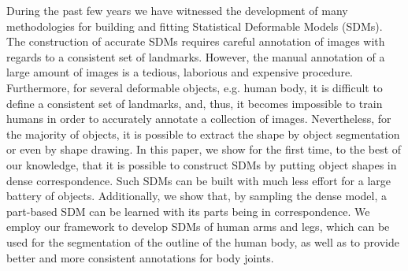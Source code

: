 
During the past few years we have witnessed the development of many methodologies for building and fitting Statistical Deformable Models (SDMs). The construction of accurate SDMs requires careful annotation of images with regards to a consistent set of landmarks. However, the manual annotation of a large amount of images is a tedious, laborious and expensive procedure. Furthermore, for several deformable objects, e.g. human body, it is difficult to define a consistent set of landmarks, and, thus, it becomes impossible to train humans in order to accurately annotate a collection of images. Nevertheless, for the majority of objects, it is possible to extract the shape by object segmentation or even by shape drawing. In this paper, we show for the first time, to the best of our knowledge, that it is possible to construct SDMs by putting object shapes in dense correspondence. Such SDMs can be built with much less effort for a large battery of objects. Additionally, we show that, by sampling the dense model, a part-based SDM can be learned with its parts being in correspondence. We employ our framework to develop SDMs of human arms and legs, which can be used for the segmentation of the outline of the human body, as well as to provide better and more consistent annotations for body joints.